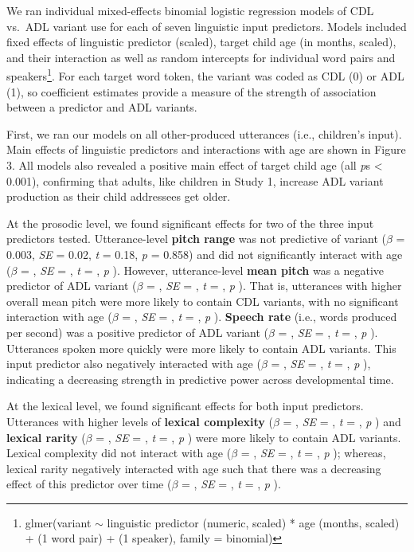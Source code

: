 \documentclass[10pt, letterpaper]{article}
\begin{document}
We ran individual mixed-effects binomial logistic regression models of
CDL vs.~ADL variant use for each of seven linguistic input predictors.
Models included fixed effects of linguistic predictor (scaled), target
child age (in months, scaled), and their interaction as well as random
intercepts for individual word pairs and speakers\footnote{glmer(variant
  \(\sim\) linguistic predictor (numeric, scaled) * age (months, scaled)
  + (1 \textbar{} word pair) + (1 \textbar{} speaker), family =
  binomial)}. For each target word token, the variant was coded as CDL
(0) or ADL (1), so coefficient estimates provide a measure of the
strength of association between a predictor and ADL variants.

First, we ran our models on all other-produced utterances (i.e.,
children's input). Main effects of linguistic predictors and
interactions with age are shown in Figure 3. All models also revealed a
positive main effect of target child age (all \emph{p}s \textless{}
0.001), confirming that adults, like children in Study 1, increase ADL
variant production as their child addressees get older.

At the prosodic level, we found significant effects for two of the three
input predictors tested. Utterance-level \textbf{pitch range} was not
predictive of variant (\(\beta\) = 0.003, \emph{SE} = 0.02, \emph{t} =
0.18, \emph{p} = 0.858) and did not significantly interact with age
(\(\beta\) = , \emph{SE} = , \emph{t} = , \emph{p} ). However,
utterance-level \textbf{mean pitch} was a negative predictor of ADL
variant (\(\beta\) = , \emph{SE} = , \emph{t} = , \emph{p} ). That is,
utterances with higher overall mean pitch were more likely to contain
CDL variants, with no significant interaction with age (\(\beta\) = ,
\emph{SE} = , \emph{t} = , \emph{p} ). \textbf{Speech rate} (i.e., words
produced per second) was a positive predictor of ADL variant (\(\beta\)
= , \emph{SE} = , \emph{t} = , \emph{p} ). Utterances spoken more
quickly were more likely to contain ADL variants. This input predictor
also negatively interacted with age (\(\beta\) = , \emph{SE} = ,
\emph{t} = , \emph{p} ), indicating a decreasing strength in predictive
power across developmental time.

At the lexical level, we found significant effects for both input
predictors. Utterances with higher levels of \textbf{lexical complexity}
(\(\beta\) = , \emph{SE} = , \emph{t} = , \emph{p} ) and \textbf{lexical
rarity} (\(\beta\) = , \emph{SE} = , \emph{t} = , \emph{p} ) were more
likely to contain ADL variants. Lexical complexity did not interact with
age (\(\beta\) = , \emph{SE} = , \emph{t} = , \emph{p} ); whereas,
lexical rarity negatively interacted with age such that there was a
decreasing effect of this predictor over time (\(\beta\) = , \emph{SE} =
, \emph{t} = , \emph{p} ).
\end{document}
